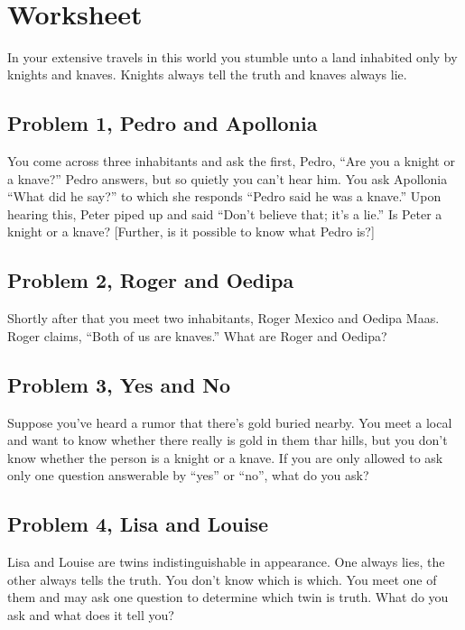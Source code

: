 \documentclass[11pt]{book}
\begin{document}
\\



\newpage
\section{Worksheet}
In your extensive travels in this world you stumble unto a land inhabited only by knights and knaves. Knights always tell the truth and knaves always lie.
\subsection{Problem 1, Pedro and Apollonia}
You come across three inhabitants and ask the first, Pedro, “Are you a knight or a knave?” Pedro answers, but so quietly you can’t hear him. You ask Apollonia “What did he say?” to which she responds “Pedro said he was a knave.” Upon hearing this, Peter piped up and said “Don’t believe that; it’s a lie.” Is Peter a knight or a knave? [Further, is it possible to know what Pedro is?]




\subsection{Problem 2, Roger and Oedipa} 
Shortly after that you meet two inhabitants, Roger Mexico and Oedipa Maas. Roger claims, “Both of us are knaves.” What are Roger and Oedipa?


 
\subsection{Problem 3, Yes and No} 
Suppose you’ve heard a rumor that there’s gold buried nearby. You meet a local and want to know whether there really is gold in them thar hills, but you don’t know whether the person is a knight or a knave. If you are only allowed to ask only one question answerable by ``yes'' or ``no'', what do you ask?


\subsection{Problem 4, Lisa and Louise}
Lisa and Louise are twins indistinguishable in appearance. One always lies, the other always tells the truth. You don’t know which is which. You meet one of them and may ask one question to determine which twin is truth. What do you ask and what does it tell you?
\end{document}
